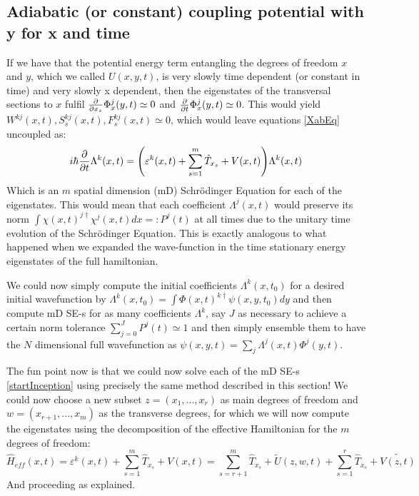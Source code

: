 \documentclass[11pt, a4paper]{article} %
\begin{document}
\subsection{Adiabatic (or constant) coupling potential with y for x and time}
If we have that the potential energy term entangling the degrees of freedom $x$ and $y$, which we called $U(x,y,t)$, is very slowly time dependent (or constant in time) and very slowly x dependent, then the eigenstates of the transversal sections to $x$ fulfil $\pdv{}{x_s}\Phi^j_x(y,t)\simeq 0$ and $\pdv{}{t}\Phi^j_x(y,t)\simeq 0$. This would yield $W^{kj}(x,t),S^{kj}_s(x,t),F^{kj}_s(x,t)\simeq 0$, which would leave equations \eqref{XabEq} uncoupled as:
\begin{equation}\label{startInception}
i\hbar \pdv{}{t}\Lambda^k(x,t) = \qty( \varepsilon^k(x,t) + \sum_{s=1}^m\hat{T}_{x_s} +V(x,t))\Lambda^k(x,t)
\end{equation}
Which is an $m$ spatial dimension (mD) Schrödinger Equation for each of the eigenstates. This would mean that each coefficient $\Lambda^j(x,t)$ would preserve its norm $\int \chi(x,t)^{j\dagger}\chi^j(x,t) dx =: P^j(t)$ at all times due to the unitary time evolution of the Schrödinger Equation. This is exactly analogous to what happened when we expanded the wave-function in the time stationary energy eigenstates of the full hamiltonian.

We could now simply compute the initial coefficients $\Lambda^k(x,t_0)$ for a desired initial wavefunction by $\Lambda^k(x,t_0)=\int \Phi(x,t)^{k\dagger} \psi(x,y,t_0)dy$ and then compute mD SE-s for as many coefficients $\Lambda^k$, say $J$ as necessary to achieve a certain norm tolerance $\sum_{j=0}^J P^j(t) \simeq 1$ and then simply ensemble them to have the $N$ dimensional full wavefunction as $\psi(x,y,t)=\sum_j\Lambda^j(x,t)\Phi^j(y,t)$.

The fun point now is that we could now solve each of the mD SE-s \eqref{startInception} using precisely the same method described in this section! We could now choose a new subset $z=(x_1,...,x_r)$ as main degrees of freedom and $w=(x_{r+1},...,x_m)$ as the transverse degrees, for which we will now compute the eigenstates using the decomposition of the effective Hamiltonian for the $m$ degrees of freedom:
$$
\hat{H}_{eff}(x,t)=\varepsilon^k(x,t) + \sum_{s=1}^m\hat{T}_{x_s} +V(x,t) = \sum_{s=r+1}^m\hat{T}_{x_s}+\tilde{U}(z,w,t) +\sum_{s=1}^r\hat{T}_{x_s} +\tilde{V(z,t)}
$$
And proceeding as explained.
\end{document}
